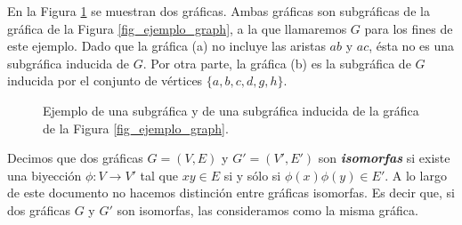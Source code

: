 En la Figura \ref{fig_ejemplo_subgraph} se muestran dos gráficas. Ambas gráficas son subgráficas de la gráfica de la Figura \ref{fig_ejemplo_graph}, a la que llamaremos $G$ para los fines de este ejemplo. Dado que la gráfica (a) no incluye las aristas $ab$ y $ac$, ésta no es una subgráfica inducida de $G$. Por otra parte, la gráfica (b) es la subgráfica de $G$ inducida por el conjunto de vértices $\{a,b,c,d,g,h\}$.


\begin{figure}[!htbp]
\centering
{}
\caption{Ejemplo de una subgráfica y de una subgráfica inducida de la gráfica de la Figura \ref{fig_ejemplo_graph}.}
\label{fig_ejemplo_subgraph}
\end{figure}

Decimos que dos gráficas $G=(V,E)$ y $G'=(V',E')$ son \textbf{\emph{isomorfas}} si existe una biyección $\phi:V\rightarrow V'$ tal que $xy\in E$ si y sólo si $\phi(x)\phi(y) \in E' $. A lo largo de este documento no hacemos distinción entre gráficas isomorfas. Es decir que, si dos gráficas $G$ y $G'$ son isomorfas, las consideramos como la misma gráfica.

